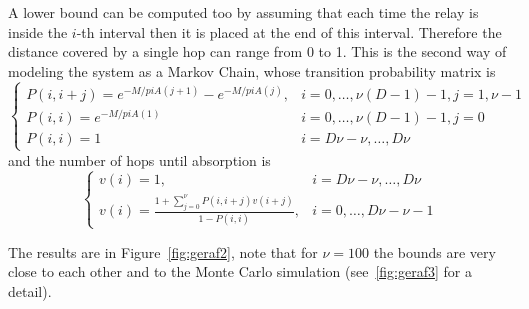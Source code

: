 \documentclass[10pt]{article}
\begin{document}
A lower bound can be computed too by assuming that each time the relay is inside the $i$-th interval then it is placed at the end of this interval. Therefore the distance covered by a single hop can range from 0 to 1. This is the second way of modeling the system as a Markov Chain, whose transition probability matrix is
\begin{equation}
\begin{cases}
  P(i, i + j) = e^{-M/pi A(j+1)} - e^{-M/pi A(j)}, & i = 0, \dots, \nu (D - 1) - 1, j = 1, \nu-1 \\
  P(i, i) = e^{-M/pi A(1)} & i = 0, \dots, \nu (D - 1) - 1, j = 0 \\
  P(i, i) = 1 & i = D\nu - \nu, \dots, D\nu 
\end{cases}
\end{equation}
and the number of hops until absorption is
\begin{equation}
\begin{cases}
  v(i) = 1, & i = D\nu - \nu , \dots, D\nu  \\
  v(i) = \frac{1+\sum_{j = 0}^{\nu} P(i, i + j) v(i + j)}{1-P(i, i)}, & i = 0, \dots, D\nu - \nu - 1
\end{cases}
\end{equation}

The results are in Figure~\ref{fig:geraf2}, note that for $\nu = 100$ the bounds are very close to each other and to the Monte Carlo simulation (see~\ref{fig:geraf3} for a detail).
\end{document}
